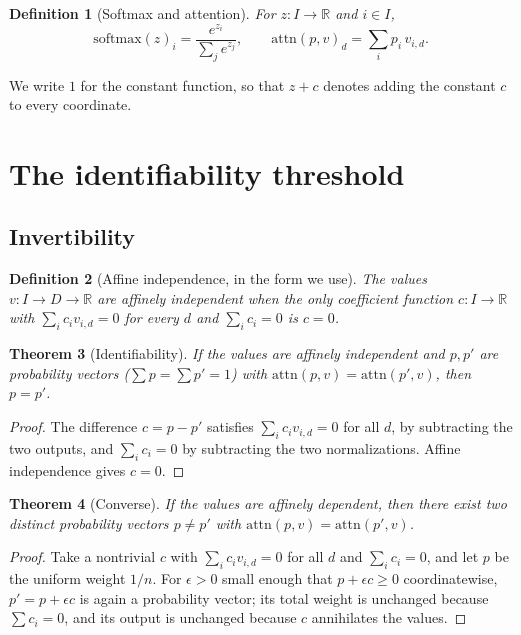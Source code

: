 \documentclass[11pt]{article}
\newtheorem{theorem}{Theorem}
\newtheorem{definition}[theorem]{Definition}
\newcommand{\R}{\mathbb{R}}
\begin{document}
\begin{definition}[Softmax and attention]
For $z : I \to \R$ and $i \in I$,
\[
  \mathrm{softmax}(z)_i = \frac{e^{z_i}}{\sum_{j} e^{z_j}},
  \qquad
  \mathrm{attn}(p,v)_d = \sum_i p_i\, v_{i,d}.
\]
\end{definition}

We write $1$ for the constant function, so that $z + c$ denotes adding the
constant $c$ to every coordinate.

\section{The identifiability threshold}\label{sec:ident}

\subsection{Invertibility}

\begin{definition}[Affine independence, in the form we use]
\label{def:affind}
The values $v : I \to D \to \R$ are affinely independent when the only
coefficient function $c : I \to \R$ with $\sum_i c_i v_{i,d} = 0$ for every $d$
and $\sum_i c_i = 0$ is $c = 0$.
\end{definition}

\begin{theorem}[Identifiability]\label{thm:inj}
If the values are affinely independent and $p, p'$ are probability vectors
($\sum p = \sum p' = 1$) with $\mathrm{attn}(p,v) = \mathrm{attn}(p',v)$, then
$p = p'$.
\end{theorem}

\begin{proof}
The difference $c = p - p'$ satisfies $\sum_i c_i v_{i,d} = 0$ for all $d$, by
subtracting the two outputs, and $\sum_i c_i = 0$ by subtracting the two normalizations.
Affine independence gives $c = 0$.
\end{proof}

\begin{theorem}[Converse]\label{thm:conv}
If the values are affinely dependent, then there exist two distinct probability
vectors $p \ne p'$ with $\mathrm{attn}(p,v) = \mathrm{attn}(p',v)$.
\end{theorem}

\begin{proof}
Take a nontrivial $c$ with $\sum_i c_i v_{i,d} = 0$ for all $d$ and
$\sum_i c_i = 0$, and let $p$ be the uniform weight $1/n$. For $\epsilon > 0$
small enough that $p + \epsilon c \ge 0$ coordinatewise, $p' = p + \epsilon c$
is again a probability vector; its total weight is unchanged because
$\sum c_i = 0$, and its output is unchanged because $c$ annihilates the values.
\end{proof}
\end{document}
